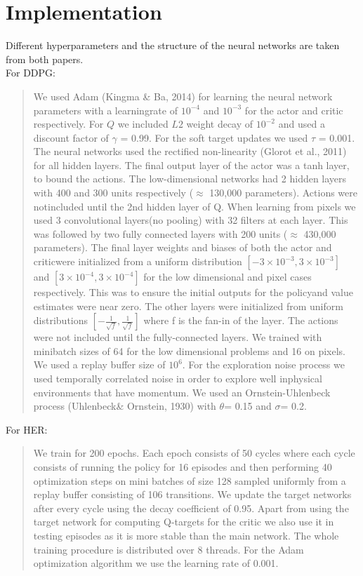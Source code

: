 \documentclass[12pt]{report}
\begin{document}
\section{Implementation}
Different hyperparameters and the structure of the neural networks are taken from both papers.\\
For DDPG:
\begin{quotation}
	We used Adam (Kingma \& Ba, 2014) for learning the neural network parameters with a  learningrate of $10^{-4}$ and $10^{-3}$ for the actor and critic respectively. For $Q$ we included $L2$ weight decay of $10^{-2}$ and used a discount factor of $\gamma$ = 0.99. For the soft target updates we used $\tau$ = 0.001. The neural networks used the rectified non-linearity (Glorot et al., 2011) for all hidden layers. The final output layer of the actor was a tanh layer, to bound the actions. The low-dimensional networks had 2 hidden layers with 400 and 300 units respectively ($\approx$ 130,000 parameters). Actions were notincluded until the 2nd hidden layer of Q. When learning from pixels we used 3 convolutional layers(no pooling) with 32 filters at each layer.  This was followed by two fully connected layers with 200 units ($\approx$ 430,000 parameters). The final layer weights and biases of both the actor and criticwere initialized from a uniform distribution $[-3\times10^{-3},3\times10^{-3}]$ and $[3\times10^{-4},3\times10^{-4}]$ for the low dimensional and pixel cases respectively. This was to ensure the initial outputs for the policyand value estimates were near zero. The other layers were initialized from uniform distributions $[-\frac{1}{\sqrt{f}},\frac{1}{\sqrt{f}}]$ where f is the fan-in of the layer. The actions were not included until the fully-connected layers. We trained with minibatch sizes of 64 for the low dimensional problems and 16 on pixels. We used a replay buffer size of $10^6$.
	For the exploration noise process we used temporally correlated noise in order to explore well inphysical environments that have momentum.  We used an Ornstein-Uhlenbeck process (Uhlenbeck\& Ornstein, 1930) with $\theta$= 0.15 and $\sigma$= 0.2. 	
\end{quotation}
For HER:
\begin{quotation}
	We train for 200 epochs. Each epoch consists of 50 cycles where each cycle consists of running the policy for 16 episodes and then performing 40 optimization steps on mini batches of size 128 sampled uniformly from a replay buffer consisting of 106 transitions. We update the target networks after every cycle using the decay coefficient of 0.95. Apart from using the target network for computing Q-targets for the critic we also use it in testing episodes as it is more stable than the main network. The whole training procedure is distributed over 8 threads. For the Adam optimization algorithm we use the learning rate of 0.001.
\end{quotation}
\end{document}
